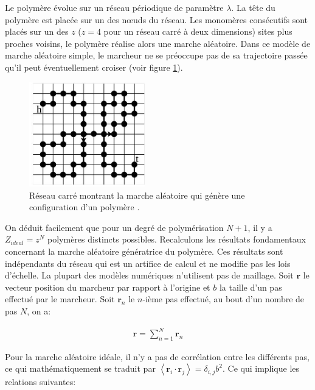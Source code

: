 Le polymère évolue sur un réseau périodique de paramètre $\lambda$. La tête du polymère est placée sur un des nœuds du réseau. Les monomères consécutifs sont placés sur un des $z$ ($z=4$ pour un réseau carré à deux dimensions) sites plus proches voisins, le polymère réalise alors une marche aléatoire. Dans ce modèle de marche aléatoire simple, le marcheur ne se préoccupe pas de sa trajectoire passée qu'il peut éventuellement croiser (voir figure \ref{resideal}).

\begin{figure}[H]
\begin{center}
\includegraphics[width=0.45\textwidth]{resideal.jpg}

\caption[Marche aléatoire sur réseau]{Réseau carré montrant la marche aléatoire qui génère une configuration d'un polymère \cite{these}.}
\label{resideal}
\end{center}
\end{figure}

On déduit facilement que pour un degré de polymérisation $N+1$, il y a $Z_{ideal}=z^N$ polymères distincts possibles. Recalculons les résultats fondamentaux concernant la marche aléatoire génératrice du polymère. Ces résultats sont indépendants du réseau qui est un artifice de calcul et ne modifie pas les lois d'échelle. La plupart des modèles numériques n'utilisent pas de maillage. Soit $\textbf{r}$ le vecteur position du marcheur par rapport à l'origine et $b$ la taille d'un pas effectué par le marcheur. Soit $\textbf{r}_n$ le $n$-ième pas effectué, au bout d'un nombre de pas $N$, on a: 

\begin{eqnarray}
\textbf{r} = \sum_{n = 1}^{N} \textbf{r}_n
\end{eqnarray}

Pour la marche aléatoire idéale, il n'y a pas de corrélation entre les différents pas, ce qui mathématiquement se traduit par $\left<\textbf{r}_i \cdot \textbf{r}_j\right> = \delta_{i,j} b^2$. Ce qui implique les relations suivantes:

